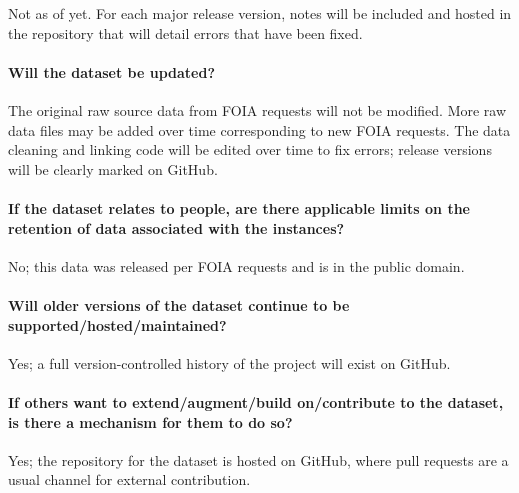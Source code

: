 Not as of yet. For each major release version, notes will be included and hosted in the repository that will detail errors that have been fixed.

\paragraph{Will the dataset be updated?}

The original raw source data from FOIA requests will not be modified. More raw data files may be added over time corresponding to new FOIA requests. The data cleaning and linking code will be edited over time to fix errors; release versions will be clearly marked on GitHub.

\paragraph{If the dataset relates to people, are there applicable limits on the retention of data associated with the instances?}

No; this data was released per FOIA requests and is in the public domain.

\paragraph{Will older versions of the dataset continue to be supported/hosted/maintained?}

Yes; a full version-controlled history of the project will exist on GitHub.

\paragraph{If others want to extend/augment/build on/contribute to the dataset, is there a mechanism for them to do so?}

Yes; the repository for the dataset is hosted on GitHub, where pull requests are a usual channel for external contribution.
